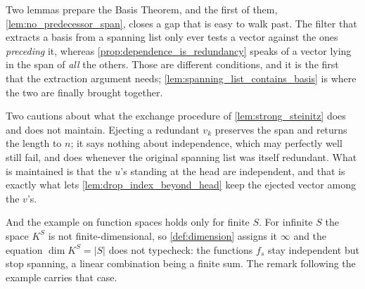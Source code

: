 \begin{ainote}
Two lemmas prepare the Basis Theorem, and the first of them,
\cref{lem:no_predecessor_span}, closes a gap that is easy to walk past. The
filter that extracts a basis from a spanning list only ever tests a vector
against the ones \emph{preceding} it, whereas
\cref{prop:dependence_is_redundancy} speaks of a vector lying in the span of
\emph{all} the others. Those are different conditions, and it is the first that
the extraction argument needs; \cref{lem:spanning_list_contains_basis} is where
the two are finally brought together.

Two cautions about what the exchange procedure of \cref{lem:strong_steinitz}
does and does not maintain. Ejecting a redundant $v_k$ preserves the span and
returns the length to $n$; it says nothing about independence, which may
perfectly well still fail, and does whenever the original spanning list was
itself redundant. What is maintained is that the $u$'s standing at the head are
independent, and that is exactly what lets
\cref{lem:drop_index_beyond_head} keep the ejected vector among the $v$'s.

And the example on function spaces holds only for finite $S$. For infinite $S$
the space $K^S$ is not finite-di\-men\-sional, so \cref{def:dimension} assigns it
$\infty$ and the equation $\dim K^S = |S|$ does not typecheck: the functions
$f_s$ stay independent but stop spanning, a linear combination being a finite
sum. The remark following the example carries that case.
\end{ainote}


